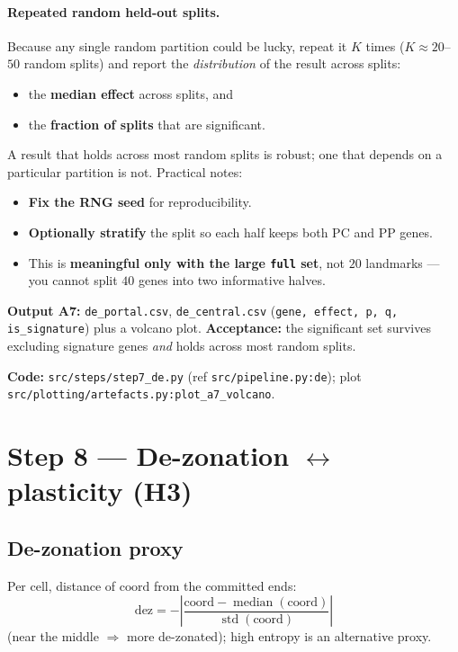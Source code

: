 \documentclass[11pt]{article}
\newcommand{\code}[1]{\texttt{\small #1}}
\newcommand{\coordc}{\mathrm{coord}}
\begin{document}
\paragraph{Repeated random held-out splits.}
Because any single random partition could be lucky, repeat it $K$ times
($K \approx 20$--$50$ random splits) and report the \emph{distribution} of the result across splits:
\begin{itemize}[leftmargin=1.4em]
  \item the \textbf{median effect} across splits, and
  \item the \textbf{fraction of splits} that are significant.
\end{itemize}
A result that holds across most random splits is robust; one that depends on a particular partition
is not. Practical notes:
\begin{itemize}[leftmargin=1.4em]
  \item \textbf{Fix the RNG seed} for reproducibility.
  \item \textbf{Optionally stratify} the split so each half keeps both PC and PP genes.
  \item This is \textbf{meaningful only with the large \code{full} set}, not $20$ landmarks ---
        you cannot split $40$ genes into two informative halves.
\end{itemize}

\textbf{Output A7:} \code{de\_portal.csv}, \code{de\_central.csv}
(\code{gene, effect, p, q, is\_signature}) plus a volcano plot.
\textbf{Acceptance:} the significant set survives excluding signature genes \emph{and} holds across
most random splits.

\medskip
\noindent\textbf{Code:} \code{src/steps/step7\_de.py} (ref \code{src/pipeline.py:de});
plot \code{src/plotting/artefacts.py:plot\_a7\_volcano}.

\section{Step 8 --- De-zonation $\leftrightarrow$ plasticity (H3)}

\subsection{De-zonation proxy}
Per cell, distance of $\coordc$ from the committed ends:
\[
  \text{dez} = -\left|\frac{\coordc - \operatorname{median}(\coordc)}{\operatorname{std}(\coordc)}\right|
\]
(near the middle $\Rightarrow$ more de-zonated); high entropy is an alternative proxy.
\end{document}
